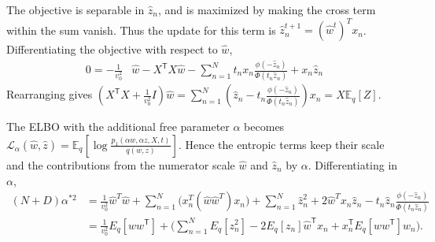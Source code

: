 \documentclass{article}
\begin{document}

The objective is separable in $\hat z_n$, and is maximized by making the cross term within the sum vanish. Thus the update for this term is $\hat z_n^{t+1}=(\hat w^t)^Tx_n$. Differentiating the objective with respect to $\hat w$, 
\begin{align*}
0
= - \frac{1}{v_0^2}&  \hat w
- X^{\mathsf T}X\hat w -\sum_{n=1}^N
 t_nx_n \frac{\phi(-\hat z_n)}{\Phi(t_n\hat z_n)}
 + x_n\hat z_n 
\end{align*}
Rearranging gives $\left(X^{\mathsf T} X + \frac{1}{v_0^2}I\right)\hat w = \sum_{n=1}^N\left(\hat z_n - 
 t_n\frac{\phi(-\hat z_n)}{\Phi(t_n\hat z_n)} \right)x_n = X\mathbb E_q[Z]$.

 The ELBO with the additional free parameter $\alpha$ becomes $\mathcal L_\alpha(\hat w,\hat z) = \mathbb E_q\left[\log\frac{p_1(\alpha w,\alpha z,X,t)}{q(w,z)}\right]$. Hence the entropic terms keep their scale and the contributions from the numerator scale $\hat w$ and $\hat z_n$ by $\alpha$. Differentiating in $\alpha$, 
\begin{align*}
(N+D)\alpha^{*2}
&= \frac{1}{v_0^2}\hat w^T \hat w 
+ \sum_{n=1}^N  \Big(x_n^T(\hat w \hat w^T)x_n\Big)
+\sum_{n=1}^N\hat z_n^2
 + 2\hat w^Tx_n\hat z_n - t_n\hat z_n\frac{\phi(-\hat z_n)}{\Phi(t_n\hat z_n)}\\
&=\frac{1}{v_0^2} E_q[w w^\mathsf T] +  \Big(\sum_{n=1}^N E_q[z_n^2] - 2E_q[z_n] \hat w^\mathsf Tx_n + x_n^\mathsf T E_q[w w^\mathsf T] w_n\Big) .
\end{align*}

\newpage
\end{document}
